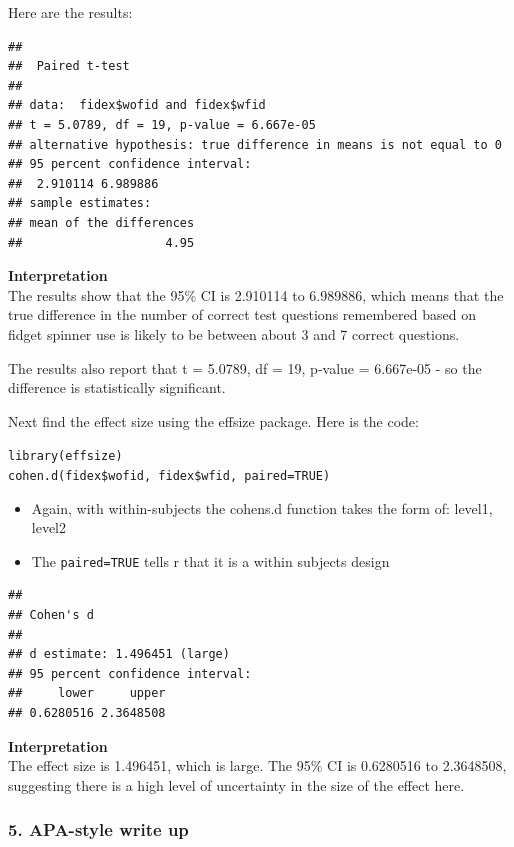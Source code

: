 \documentclass[
]{book}
\providecommand{\tightlist}{%
  \setlength{\itemsep}{0pt}\setlength{\parskip}{0pt}}
\begin{document}
Here are the results:

\begin{verbatim}
## 
##  Paired t-test
## 
## data:  fidex$wofid and fidex$wfid
## t = 5.0789, df = 19, p-value = 6.667e-05
## alternative hypothesis: true difference in means is not equal to 0
## 95 percent confidence interval:
##  2.910114 6.989886
## sample estimates:
## mean of the differences 
##                    4.95
\end{verbatim}

\textbf{Interpretation}\\
The results show that the 95\% CI is 2.910114 to 6.989886, which means that the true difference in the number of correct test questions remembered based on fidget spinner use is likely to be between about 3 and 7 correct questions.

The results also report that t = 5.0789, df = 19, p-value = 6.667e-05 - so the difference is statistically significant.

Next find the effect size using the effsize package. Here is the code:

\texttt{library(effsize)}\\
\texttt{cohen.d(fidex\$wofid,\ fidex\$wfid,\ paired=TRUE)}

\begin{itemize}
\tightlist
\item
  Again, with within-subjects the cohens.d function takes the form of: level1, level2\\
\item
  The \texttt{paired=TRUE} tells r that it is a within subjects design
\end{itemize}

\begin{verbatim}
## 
## Cohen's d
## 
## d estimate: 1.496451 (large)
## 95 percent confidence interval:
##     lower     upper 
## 0.6280516 2.3648508
\end{verbatim}

\textbf{Interpretation}\\
The effect size is 1.496451, which is large. The 95\% CI is 0.6280516 to 2.3648508, suggesting there is a high level of uncertainty in the size of the effect here.

\hypertarget{apa-style-write-up}{%
\subsubsection{5. APA-style write up}\label{apa-style-write-up}}
\end{document}
